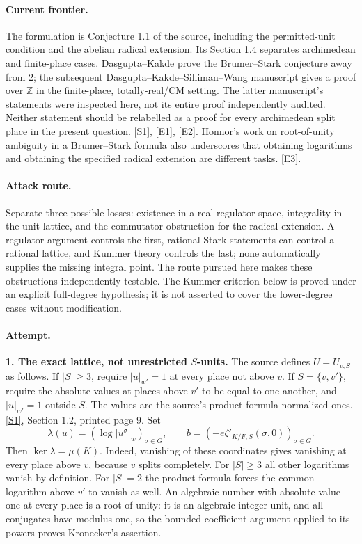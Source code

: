 \documentclass[11pt,a4paper]{article}
\newcommand{\Z}{\mathbb{Z}}
\newcommand{\sref}[2]{\hyperlink{source:#1:#2}{[S#2]}}
\newcommand{\eref}[2]{\hyperlink{extra:#1:#2}{[E#2]}}
\numberwithin{equation}{section}
\begin{document}
\paragraph{Current frontier.}
The formulation is Conjecture 1.1 of the source, including the permitted-unit
condition and the abelian radical extension. Its Section 1.4 separates
archimedean and finite-place cases. Dasgupta--Kakde prove the Brumer--Stark
conjecture away from 2; the subsequent Dasgupta--Kakde--Silliman--Wang
manuscript gives a proof over $\Z$ in the finite-place, totally-real/CM
setting. The latter manuscript's statements were inspected here, not its
entire proof independently audited. Neither statement should be relabelled
as a proof for every archimedean split place in the present question.
\sref{30001846}{1}, \eref{30001846}{1}, \eref{30001846}{2}.
Honnor's work on root-of-unity ambiguity in a Brumer--Stark formula also
underscores that obtaining logarithms and obtaining the specified radical
extension are different tasks. \eref{30001846}{3}.

\paragraph{Attack route.}
Separate three possible losses: existence in a real regulator space,
integrality in the unit lattice, and the commutator obstruction for the
radical extension. A regulator argument controls the first, rational Stark
statements can control a rational lattice, and Kummer theory controls the
last; none automatically supplies the missing integral point. The route
pursued here makes these obstructions independently testable. The Kummer
criterion below is proved under an explicit full-degree hypothesis; it is
not asserted to cover the lower-degree cases without modification.

\paragraph{Attempt.}
\textbf{1. The exact lattice, not unrestricted $S$-units.}
The source defines $U=U_{v,S}$ as follows. If $|S|\ge3$, require
$|u|_{w'}=1$ at every place not above $v$. If $S=\{v,v'\}$, require the
absolute values at places above $v'$ to be equal to one another, and
$|u|_{w'}=1$ outside $S$. The values are the source's product-formula
normalized ones. \sref{30001846}{1}, Section 1.2, printed page 9.
Set
\begin{equation}\label{eq:30001846:lattice}
 \lambda(u)=(\log|u^\sigma|_w)_{\sigma\in G},\qquad
 b=(-e\zeta'_{K/F,S}(\sigma,0))_{\sigma\in G}.
\end{equation}
Then $\ker\lambda=\mu(K)$. Indeed, vanishing of these coordinates gives
vanishing at every place above $v$, because $v$ splits completely.
For $|S|\ge3$ all other logarithms vanish by definition. For $|S|=2$
the product formula forces the common logarithm above $v'$ to vanish as
well. An algebraic number with absolute value one at every place is a
root of unity: it is an algebraic integer unit, and all conjugates have
modulus one, so the bounded-coefficient argument applied to its powers
proves Kronecker's assertion.
\end{document}
